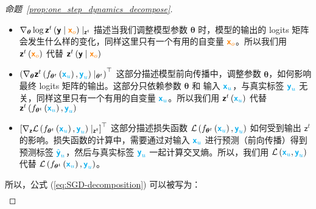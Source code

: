 \documentclass[citestyle=gb7714-2015, bibstyle=gb7714-2015,lang=cn,14pt,scheme=chinese]{elegantbook}
\begin{document}
\begin{proof}[命题~\ref{prop:one_step_dynamics_decompose}]
\begin{itemize}
    \item \(\nabla_{\bm{\theta}} \log \bm{\mathsf{z}}^{t} \left( \bm{\mathsf{y}} \mid \textcolor{orange}{\bm{\mathsf{x}}_{o}} \right) \mid_{\bm{\mathsf{z}}^{t}}\) 描述当我们调整模型参数 \(\bm{\theta}\) 时，模型的输出的 logits 矩阵会发生什么样的变化，同样这里只有一个有用的自变量 \(\textcolor{orange}{\bm{\mathsf{x}}_{o}}\)。所以我们用 \(\bm{\mathsf{z}}^{t} \left( \textcolor{orange}{\bm{\mathsf{x}}_{o}} \right) \) 代替 \(\bm{\mathsf{z}}^{t} \left( \bm{\mathsf{y}} \mid \textcolor{orange}{\bm{\mathsf{x}}_{o}} \right)\)
    \item \(\left( \nabla_{\bm{\theta}} \bm{\mathsf{z}}^{t} \left( f_{\bm{\theta}^{t}} \left( \textcolor{cyan}{\bm{\mathsf{x}}_{u}} \right), \textcolor{cyan}{\bm{\mathsf{y}}_{u}} \right) \mid_{\bm{\theta}^{t}} \right)^{\top}\) 这部分描述模型前向传播中，调整参数 \(\bm{\theta}\)，如何影响最终 logits 矩阵的输出。这部分只依赖参数 \(\bm{\theta}\) 和 输入 \(\textcolor{cyan}{\bm{\mathsf{x}}_{u}}\)，与真实标签 \(\textcolor{cyan}{\bm{\mathsf{y}}_{u}}\) 无关，同样这里只有一个有用的自变量 \(\textcolor{cyan}{\bm{\mathsf{x}}_{u}}\)。所以我们用 \(\bm{\mathsf{z}}^{t} \left( \textcolor{cyan}{\bm{\mathsf{x}}_{u}} \right)\) 代替 \(\bm{\mathsf{z}}^{t} \left( f_{\bm{\theta}^{t}} \left( \textcolor{cyan}{\bm{\mathsf{x}}_{u}} \right), \textcolor{cyan}{\bm{\mathsf{y}}_{u}} \right)\)
    \item \(\left[ \nabla_{\bm{\mathsf{z}}} \mathcal{L} \left( f_{\bm{\theta}^{t}} \left( \textcolor{cyan}{\bm{\mathsf{x}}_{u}} \right), \textcolor{cyan}{\bm{\mathsf{y}}_{u}} \right) \mid_{\bm{\mathsf{z}}^{t}} \right]^{\top}\) 这部分描述损失函数 \(\mathcal{L} \left( f_{\bm{\theta}^{t}} \left( \textcolor{cyan}{\bm{\mathsf{x}}_{u}} \right), \textcolor{cyan}{\bm{\mathsf{y}}_{u}} \right)\) 如何受到输出 \(\bm{\mathsf{z}}^{t}\) 的影响。损失函数的计算中，需要通过对输入 \(\textcolor{cyan}{\bm{\mathsf{x}}_{u}}\) 进行预测（前向传播）得到预测标签 \(\textcolor{cyan}{\hat{\bm{\mathsf{y}}}_{u}}\)，然后与真实标签 \(\textcolor{cyan}{\bm{\mathsf{y}}_{u}}\) 一起计算交叉熵。所以，我们用 \(\mathcal{L} \left( \textcolor{cyan}{\bm{\mathsf{x}}_{u}}, \textcolor{cyan}{\bm{\mathsf{y}}_{u}} \right)\) 代替 \(\mathcal{L} \left( f_{\bm{\theta}^{t}} \left( \textcolor{cyan}{\bm{\mathsf{x}}_{u}} \right), \textcolor{cyan}{\bm{\mathsf{y}}_{u}} \right)\)。
\end{itemize}
所以，公式 (\ref{eq:SGD-decomposition}) 可以被写为：
\begin{equation}\label{eq:SGD-decomposition-simplified}
\begin{aligned}

\end{aligned}
\end{equation}
\end{proof}
\end{document}
